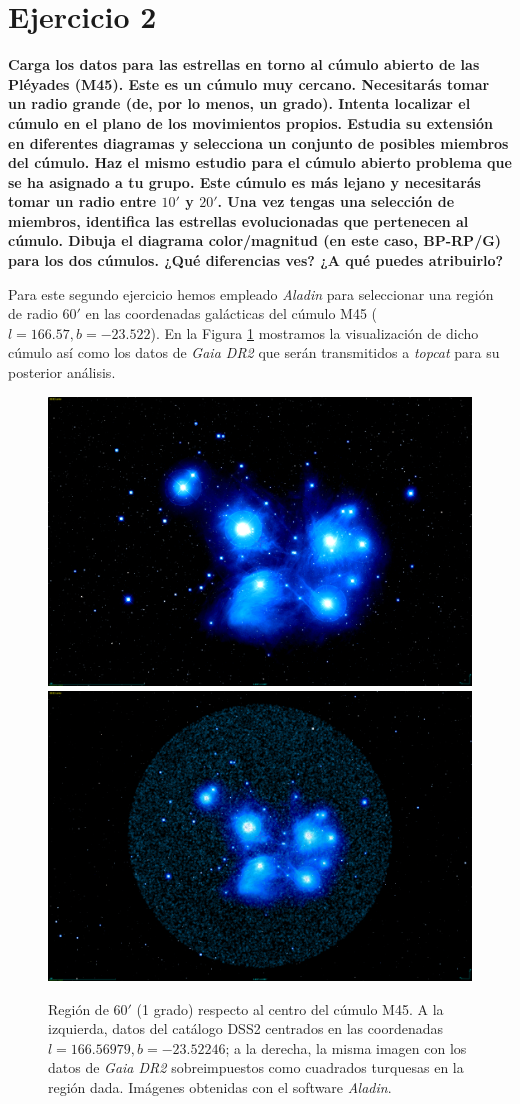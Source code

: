 \documentclass[a4paper,fleqn,usenatbib]{mnras}
\begin{document}
\section{Ejercicio 2}

\textbf{Carga los datos para las estrellas en torno al cúmulo abierto de las Pléyades (M45). Este es un cúmulo muy cercano. Necesitarás tomar un radio grande (de, por lo menos, un grado). Intenta localizar el cúmulo en el plano de los movimientos propios. Estudia su extensión en diferentes diagramas y selecciona un conjunto de posibles miembros del cúmulo. Haz el mismo estudio para el cúmulo abierto problema que se ha asignado a tu grupo. Este cúmulo es más lejano y necesitarás tomar un radio entre $10'$ y $20'$. Una vez tengas una selección de miembros, identifica las estrellas evolucionadas que pertenecen al cúmulo. Dibuja el diagrama color/magnitud (en este caso, BP-RP/G) para los dos cúmulos. ¿Qué diferencias ves? ¿A qué puedes atribuirlo?}

Para este segundo ejercicio hemos empleado \emph{Aladin} para seleccionar una región de radio $60'$ en las coordenadas galácticas del cúmulo M45 ($l=166.57, b=-23.522$). En la Figura \ref{fig:e2_m45} mostramos la visualización de dicho cúmulo así como los datos de \emph{Gaia DR2} que serán transmitidos a \emph{topcat} para su posterior análisis.

\begin{figure}
  \centering
  \includegraphics[width=0.75\linewidth]{img/pleyades}
  \includegraphics[width=0.75\linewidth]{img/pleyades_gaia}
  \caption{Región de $60'$ (1 grado) respecto al centro del cúmulo M45. A la izquierda, datos del catálogo \ac{DSS2} centrados en las coordenadas $l=166.56979, b=-23.52246$; a la derecha, la misma imagen con los datos de \emph{Gaia DR2} sobreimpuestos como cuadrados turquesas en la región dada. Imágenes obtenidas con el software \emph{Aladin}.}
  \label{fig:e2_m45}
\end{figure}
\end{document}
